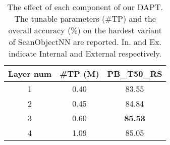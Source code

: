 \begin{table}[!t]
\scriptsize
\setlength{\tabcolsep}{7.5mm}
\centering
\caption{The effect of each component of our DAPT. The tunable parameters (\#TP) and the overall accuracy (\%) on the hardest variant of ScanObjectNN are reported. In. and Ex. indicate Internal and External respectively.}
\label{tab:components}

\begin{tabular}{ccc}
\toprule
Layer num & \#TP (M) & PB\_T50\_RS \\
\midrule
1 & 0.40 & 83.55 \\
2 & 0.45 & 84.84 \\
\rowcolor{linecolor!40}3 & 0.60 & \textbf{85.53} \\
4 & 1.09 & 85.05 \\
\bottomrule
\end{tabular}
\end{table}
